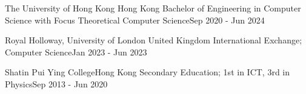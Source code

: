 \resumeSubHeadingListStart

\resumeSubheading
    {The University of Hong Kong}{ Hong Kong}
    {Bachelor of Engineering in Computer Science with Focus Theoretical Computer Science}{Sep 2020 - Jun 2024}
    
\resumeSubheading
    {Royal Holloway, University of London}{ United Kingdom}
    {International Exchange; Computer Science}{Jan 2023 - Jun 2023}
    
\resumeSubheading
    {Shatin Pui Ying College}{Hong Kong}
    {Secondary Education;   1st in ICT, 3rd in Physics}{Sep 2013 - Jun 2020}
    
\resumeSubHeadingListEnd
